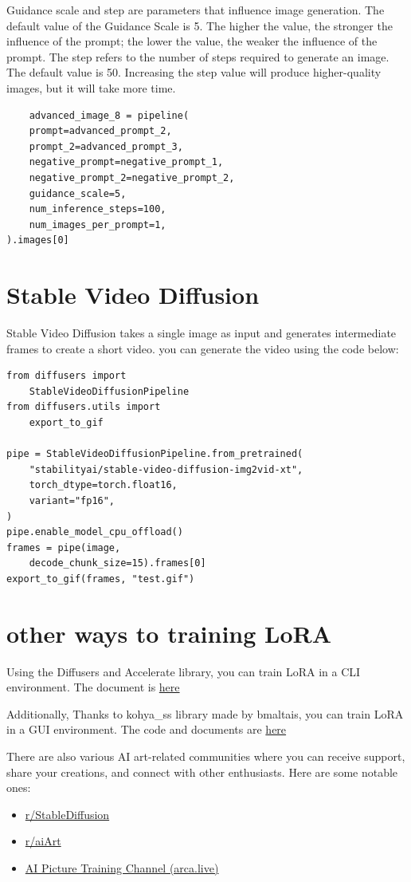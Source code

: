 \documentclass[extendedabs]{bmvc2k}
\begin{document}
Guidance scale and step are parameters that influence image generation. The default value of the Guidance Scale is 5. The higher the value, the stronger the influence of the prompt; the lower the value, the weaker the influence of the prompt. The step refers to the number of steps required to generate an image. The default value is 50. Increasing the step value will produce higher-quality images, but it will take more time.

\begin{verbatim}
    advanced_image_8 = pipeline(
    prompt=advanced_prompt_2,
    prompt_2=advanced_prompt_3,
    negative_prompt=negative_prompt_1,
    negative_prompt_2=negative_prompt_2,
    guidance_scale=5,
    num_inference_steps=100,
    num_images_per_prompt=1,
).images[0]
\end{verbatim}

\section{Stable Video Diffusion}
Stable Video Diffusion\cite{videodiffusion} takes a single image as input and generates intermediate frames to create a short video.
you can generate the video using the code below:
\begin{verbatim}
from diffusers import 
    StableVideoDiffusionPipeline
from diffusers.utils import 
    export_to_gif

pipe = StableVideoDiffusionPipeline.from_pretrained(
    "stabilityai/stable-video-diffusion-img2vid-xt",
    torch_dtype=torch.float16,
    variant="fp16",
)
pipe.enable_model_cpu_offload()
frames = pipe(image, 
    decode_chunk_size=15).frames[0]
export_to_gif(frames, "test.gif")

\end{verbatim}

\section{other ways to training LoRA}
Using the Diffusers and Accelerate library, you can train LoRA in a CLI environment. The document is \href{https://huggingface.co/docs/diffusers/en/training/lora}{here}

Additionally, Thanks to kohya\_ss library made by bmaltais, you can train LoRA in a GUI environment. The code and documents are \href{https://github.com/bmaltais/kohya_ss}{here}

There are also various AI art-related communities where you can receive support, share your creations, and connect with other enthusiasts. Here are some notable ones:
\begin{itemize}
    \item \href{https://www.reddit.com/r/StableDiffusion/}{r/StableDiffusion}
    \item \href{https://www.reddit.com/r/aiArt/}{r/aiArt}
    \item \href{https://arca.live/b/hypernetworks}{AI Picture Training Channel (arca.live)}
\end{itemize}
\end{document}
